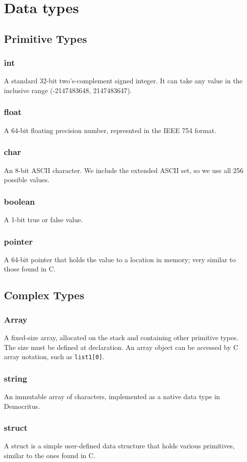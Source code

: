 \section{Data types}
    \subsection{Primitive Types}
        \subsubsection{int}
            A standard 32-bit two's-complement signed integer. It can take any value in the inclusive range (-2147483648, 2147483647).
        \subsubsection{float}
            A 64-bit floating precision number, represnted in the IEEE 754 format.            
        \subsubsection{char}
            An 8-bit ASCII character. We include the extended ASCII set, so we use all 256 possible values.
        \subsubsection{boolean}
            A 1-bit true or false value.
        \subsubsection{pointer}
            A 64-bit pointer that holds the value to a location in memory; very similar to those found in C.
    \subsection{Complex Types}
        \subsubsection{Array}
            A fixed-size array, allocated on the stack and containing other primitive types. The size must be defined at declaration. An array object can be accessed by C array notation, such as \texttt{list1[0]}.
        \subsubsection{string}
                An immutable array of characters, implemented as a native data type in Democritus.
       \subsubsection{struct}
            A struct is a simple user-defined data structure that holds various primitives, similar to the ones found in C. 

